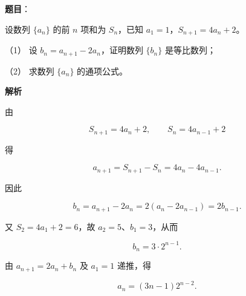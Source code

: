 \begin{answer}

\textbf{题目}：

设数列 $\{a_n\}$ 的前 $n$ 项和为 $S_n$，已知 $a_1=1$，$S_{n+1}=4a_n+2$。

（1） 设 $b_n=a_{n+1}-2a_n$，证明数列 $\{b_n\}$ 是等比数列；

（2） 求数列 $\{a_n\}$ 的通项公式。

\textbf{解析}


由

\nopagebreak[4]
\[
S_{n+1}=4a_n+2,\qquad S_n=4a_{n-1}+2
\]

得

\nopagebreak[4]
\[
a_{n+1}=S_{n+1}-S_n=4a_n-4a_{n-1}.
\]

因此

\nopagebreak[4]
\[
b_n=a_{n+1}-2a_n
=2(a_n-2a_{n-1})=2b_{n-1}.
\]

又 $S_2=4a_1+2=6$，故 $a_2=5$、$b_1=3$，从而

\nopagebreak[4]
\[
b_n=3\cdot2^{n-1}.
\]


由 $a_{n+1}=2a_n+b_n$ 及 $a_1=1$ 递推，得

\nopagebreak[4]
\[
a_n=(3n-1)2^{n-2}.
\]



\end{answer}
